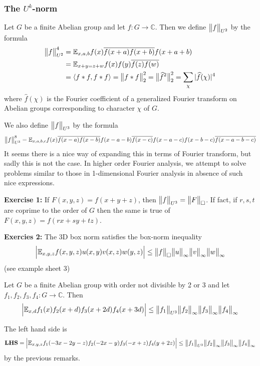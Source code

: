 \documentclass[12pt,a4paper]{report}
\renewcommand{\hat}{\widehat}
\newenvironment{proof}
{\begin{changemargin}{1cm}{0.5cm}
	}%
	{\end{changemargin}
}
\begin{document}
\subsubsection*{The $U^k$-norm}

Let $G$ be a finite Abelian group and let $f: G\rightarrow \mathbb{C}$. Then we define $\bigl\lVert f\bigr\rVert_{U^2}$ by the formula
\begin{align*}
\norms{f}{U^2}^4 &= \avg_{x,a,b} f(x) \bar{f(x+a)}\bar{f(x+b)}f(x+a+b) \\
&= \avg_{x+y =z+w} f(x)f(y)\bar{f(z)}\bar{f(w)} \\
&= \langle f * f, f*f \rangle = \norms{f* f}{2}^2 = \norms{\hat{f}^2}{2}^2 = \sum_{\chi} |\hat{f}(\chi)|^4
\end{align*}
where $\hat{f}(\chi)$ is the Fourier coefficient of a generalized Fourier transform on Abelian groups corresponding to character $\chi$ of $G$.

\quad We also define $\bigl\lVert f\bigr\rVert_{U^3}$ by the formula
\begin{align*}
\bigl\lVert f\bigr\rVert_{U^3}^8 = \mathbb{E}_{x,a,b,c} f(x) \overline{f(x-a)} \overline{f(x-b)} f(x-a-b) \overline{f(x-c)} f(x-a-c) f(x-b-c)\overline{f(x-a-b-c)}
\end{align*}
It seems there is a nice way of expanding this in terms of Fourier transform, but sadly this is not the case. In higher order Fourier analysis, we attempt to solve problems similar to those in 1-dimensional Fourier analysis in absence of such nice expressions.
\s

\textbf{Exercise 1:} If $F(x,y,z) = f(x+y+z)$, then $\bigl\lVert f\bigr\rVert_{U^3} = \bigl\lVert F\bigr\rVert_{\tiny{\square}}$. If fact, if $r,s,t$ are coprime to the order of $G$ then the same is true of $F(x,y,z) = f(rx+sy+tz)$.
\s

\textbf{Exercies 2:} The 3D box norm satisfies the box-norm inequality
\begin{align*}
\Big| \mathbb{E}_{x,y,z} f(x,y,z) u(x,y) v(x,z) w(y,z) \Big| \leq \bigl\lVert f\bigr\rVert_{\tiny{\square}} \bigl\lVert u\bigr\rVert_{\infty} \bigl\lVert v\bigr\rVert_{\infty} \bigl\lVert w\bigr\rVert_{\infty}
\end{align*}
(see example sheet 3)
\s

 Let $G$ be a finite Abelian group with order not divisible by 2 or 3 and let $f_1, f_2, f_3, f_4 : G \rightarrow \mathbb{C}$. Then
\begin{align*}
\Big| \mathbb{E}_{x,d} f_1(x) f_2(x+d) f_3(x+2d) f_4(x+3d) \Big| \leq \bigl\lVert f_1\bigr\rVert_{U^3} \bigl\lVert f_2\bigr\rVert_{\infty} \bigl\lVert f_3\bigr\rVert_{\infty}\bigl\lVert f_4\bigr\rVert_{\infty}
\end{align*}
\begin{proof}
\pf The left hand side is
\begin{align*}
\textbf{LHS} = \Big| \mathbb{E}_{x,y,z} f_1(-3x-2y-z) f_2(-2x-y) f_3(-x+z) f_4(y+2z) \Big| \leq \bigl\lVert f_1\bigr\rVert_{U^3} \bigl\lVert f_2\bigr\rVert_{\infty} \bigl\lVert f_3\bigr\rVert_{\infty}\bigl\lVert f_4\bigr\rVert_{\infty}
\end{align*}
by the previous remarks.

\eop 
\end{proof}
\s
\end{document}
